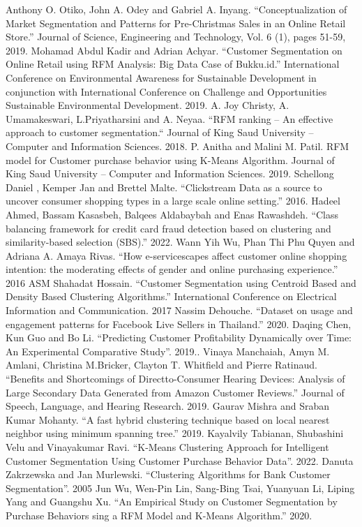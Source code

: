 \documentclass[conference]{IEEEtran}
\begin{document}
\begin{thebibliography}{00}
	 Anthony O. Otiko, John A. Odey and Gabriel A. Inyang. ``Conceptualization of Market Segmentation and Patterns for Pre-Christmas Sales in an Online Retail Store.'' Journal of Science, Engineering and Technology, Vol. 6 (1), pages 51-59, 2019.
	 Mohamad Abdul Kadir and Adrian Achyar. ``Customer Segmentation on Online Retail using RFM Analysis: Big Data Case of Bukku.id.'' International Conference on Environmental Awareness for Sustainable Development in conjunction with International Conference on Challenge and Opportunities Sustainable Environmental Development. 2019.
	 A. Joy Christy, A. Umamakeswari, L.Priyatharsini and A. Neyaa. ``RFM ranking – An effective approach to customer segmentation.`` Journal of King Saud University – Computer and Information Sciences. 2018.
	 P. Anitha and Malini M. Patil. RFM model for Customer purchase behavior using K-Means Algorithm. Journal of King Saud University – Computer and Information Sciences. 2019.
	 Schellong Daniel , Kemper Jan and Brettel Malte. ``Clickstream Data as a source to uncover consumer shopping types in a large scale online setting.'' 2016.
	 Hadeel Ahmed, Bassam Kasasbeh, Balqees Aldabaybah and Enas Rawashdeh. ``Class balancing framework for credit card fraud detection based on clustering and similarity-based selection (SBS).'' 2022.
	 Wann Yih Wu, Phan Thi Phu Quyen and Adriana A. Amaya Rivas. ``How e-servicescapes affect customer online shopping intention: the moderating effects of gender and online purchasing experience.'' 2016
	 ASM Shahadat Hossain. ``Customer Segmentation using Centroid Based and Density Based Clustering Algorithms.'' International Conference on Electrical Information and Communication. 2017
	 Nassim Dehouche. ``Dataset on usage and engagement patterns for Facebook Live Sellers in Thailand.'' 2020.
	 Daqing Chen, Kun Guo and Bo Li. “Predicting Customer Profitability Dynamically over Time: An Experimental Comparative Study”. 2019..
	 Vinaya Manchaiah, Amyn M. Amlani, Christina M.Bricker, Clayton T. Whitfield and Pierre Ratinaud. “Benefits and Shortcomings of Directto-Consumer Hearing Devices: Analysis of Large Secondary Data Generated from Amazon Customer Reviews.” Journal of Speech, Language, and Hearing Research. 2019.
	 Gaurav Mishra and Sraban Kumar Mohanty. ``A fast hybrid clustering technique based on local nearest neighbor using minimum spanning tree.'' 2019.
	 Kayalvily Tabianan, Shubashini Velu and Vinayakumar Ravi. “K-Means Clustering Approach for Intelligent Customer Segmentation Using Customer Purchase Behavior Data”. 2022.
	 Danuta Zakrzewska and Jan Murlewski. “Clustering Algorithms for Bank Customer Segmentation”. 2005
	  Jun Wu, Wen-Pin Lin, Sang-Bing Tsai, Yuanyuan Li, Liping Yang and Guangshu Xu. “An Empirical Study on Customer Segmentation by Purchase Behaviors  sing a RFM Model and K-Means Algorithm.” 2020.
	
\end{thebibliography}
\end{document}
